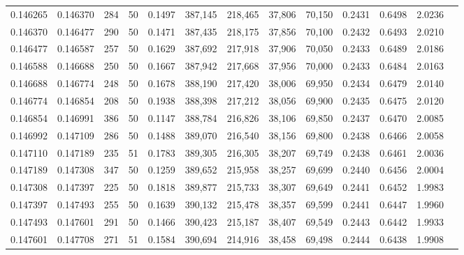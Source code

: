 \begin{tabular}{rrrrrrrrrrrrr}
0.146265 & 0.146370 &   284 &  50 &                                     0.1497 & 387,145 & 218,465 &  37,806 &  70,150 & 0.2431 & 0.6498 & 2.0236 \\
0.146370 & 0.146477 &   290 &  50 &                                     0.1471 & 387,435 & 218,175 &  37,856 &  70,100 & 0.2432 & 0.6493 & 2.0210 \\
0.146477 & 0.146587 &   257 &  50 &                                     0.1629 & 387,692 & 217,918 &  37,906 &  70,050 & 0.2433 & 0.6489 & 2.0186 \\
0.146588 & 0.146688 &   250 &  50 &                                     0.1667 & 387,942 & 217,668 &  37,956 &  70,000 & 0.2433 & 0.6484 & 2.0163 \\
0.146688 & 0.146774 &   248 &  50 &                                     0.1678 & 388,190 & 217,420 &  38,006 &  69,950 & 0.2434 & 0.6479 & 2.0140 \\
0.146774 & 0.146854 &   208 &  50 &                                     0.1938 & 388,398 & 217,212 &  38,056 &  69,900 & 0.2435 & 0.6475 & 2.0120 \\
0.146854 & 0.146991 &   386 &  50 &                                     0.1147 & 388,784 & 216,826 &  38,106 &  69,850 & 0.2437 & 0.6470 & 2.0085 \\
0.146992 & 0.147109 &   286 &  50 &                                     0.1488 & 389,070 & 216,540 &  38,156 &  69,800 & 0.2438 & 0.6466 & 2.0058 \\
0.147110 & 0.147189 &   235 &  51 &                                     0.1783 & 389,305 & 216,305 &  38,207 &  69,749 & 0.2438 & 0.6461 & 2.0036 \\
0.147189 & 0.147308 &   347 &  50 &                                     0.1259 & 389,652 & 215,958 &  38,257 &  69,699 & 0.2440 & 0.6456 & 2.0004 \\
0.147308 & 0.147397 &   225 &  50 &                                     0.1818 & 389,877 & 215,733 &  38,307 &  69,649 & 0.2441 & 0.6452 & 1.9983 \\
0.147397 & 0.147493 &   255 &  50 &                                     0.1639 & 390,132 & 215,478 &  38,357 &  69,599 & 0.2441 & 0.6447 & 1.9960 \\
0.147493 & 0.147601 &   291 &  50 &                                     0.1466 & 390,423 & 215,187 &  38,407 &  69,549 & 0.2443 & 0.6442 & 1.9933 \\
0.147601 & 0.147708 &   271 &  51 &                                     0.1584 & 390,694 & 214,916 &  38,458 &  69,498 & 0.2444 & 0.6438 & 1.9908 \\

\end{tabular}

